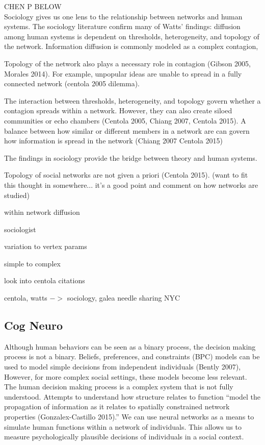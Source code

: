 \documentclass[10pt,letterpaper]{article}
\begin{document}
CHEN P BELOW\\
Sociology gives us one lens to the relationship between networks and human systems.
The sociology literature confirm many of Watts' findings:
diffusion among human systems is dependent on thresholds, heterogeneity, and topology of the network.
Information diffusion is commonly modeled as a complex contagion,

Topology of the network also plays a necessary role in contagion (Gibson 2005, Morales 2014).
For example, unpopular ideas are unable to spread in a fully connected network (centola 2005 dilemma).

The interaction between thresholds, heterogeneity, and topology govern whether a contagion
spreads within a network.
However, they can also create siloed communities or echo chambers
(Centola 2005, Chiang 2007, Centola 2015).
A balance between how similar or different members in a network are can govern how
information is spread in the network (Chiang 2007 Centola 2015)

The findings in sociology provide the bridge between theory and human systems.

\hrulefill

Topology of social networks are not given a priori (Centola 2015).
(want to fit this thought in somewhere... it's a good point and comment on how networks are studied)

within network diffusion

sociologist

variation to vertex params

simple to complex

look into centola citations

centola, watts $->$ sociology, galea needle sharing NYC

\subsection{Cog Neuro}

Although human behaviors can be seen as a binary process,
the decision making process is not a binary.
Beliefs, preferences, and constraints (BPC) models
can be used to model simple decisions from independent individuals (Bently 2007),
However, for more complex social settings, these models become less relevant.
The human decision making process is a complex system that is not fully understood.
Attempts to understand how structure relates to function ``model the propagation of
information as it relates to spatially constrained network properties (Gonzalex-Castillo 2015).''
We can use neural networks as a means to simulate human functions within a network of individuals.
This allows us to measure psychologically plausible decisions of individuals in a social context.
\end{document}
